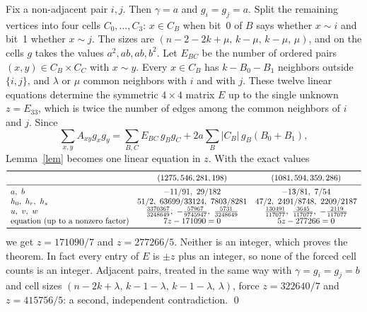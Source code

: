 \documentclass[11pt]{article}
\begin{document}
Fix a non-adjacent pair $i,j$. Then $\gamma=a$ and $g_i=g_j=a$. Split the remaining vertices into four cells
$C_0,\dots,C_3$: $x\in C_B$ when bit~0 of $B$ says whether $x\sim i$ and bit~1 whether $x\sim j$. The sizes are
$(n-2-2k+\mu,\,k-\mu,\,k-\mu,\,\mu)$, and on the cells $g$ takes the values $a^2,ab,ab,b^2$. Let $E_{BC}$ be the number
of ordered pairs $(x,y)\in C_B\times C_C$ with $x\sim y$. Every $x\in C_B$ has $k-B_0-B_1$ neighbors outside
$\{i,j\}$, and $\lambda$ or $\mu$ common neighbors with $i$ and with $j$. These twelve linear equations determine the
symmetric $4\times4$ matrix $E$ up to the single unknown $z=E_{33}$, which is twice the number of edges among the
common neighbors of $i$ and $j$. Since
\[ \sum_{x,y}A_{xy}g_xg_y=\sum_{B,C}E_{BC}\,g_Bg_C+2a\sum_B|C_B|\,g_B(B_0+B_1), \]
Lemma~\ref{lem} becomes one linear equation in $z$. With the exact values
\[
\begin{array}{lcc}
\toprule
& (1275,546,281,198) & (1081,594,359,286)\\
\midrule
a,\ b & -11/91,\ 29/182 & -13/81,\ 7/54\\
h_0,\ h_r,\ h_s & 51/2,\ 63699/33124,\ 7803/8281 & 47/2,\ 2491/8748,\ 2209/2187\\
u,\ v,\ w & \tfrac{3370367}{3248649},\ -\tfrac{57967}{9745947},\ \tfrac{5731}{3248649}
 & \tfrac{130491}{117077},\ \tfrac{3645}{117077},\ -\tfrac{2119}{117077}\\
\text{equation (up to a nonzero factor)} & 7z-171090=0 & 5z-277266=0\\
\bottomrule
\end{array}
\]
we get $z=171090/7$ and $z=277266/5$. Neither is an integer, which proves the theorem. In fact every entry of $E$ is
$\pm z$ plus an integer, so none of the forced cell counts is an integer. Adjacent pairs, treated in
the same way with $\gamma=g_i=g_j=b$ and cell sizes $(n-2k+\lambda,\,k-1-\lambda,\,k-1-\lambda,\,\lambda)$, force
$z=322640/7$ and $z=415756/5$: a second, independent contradiction. \qed
\end{document}
